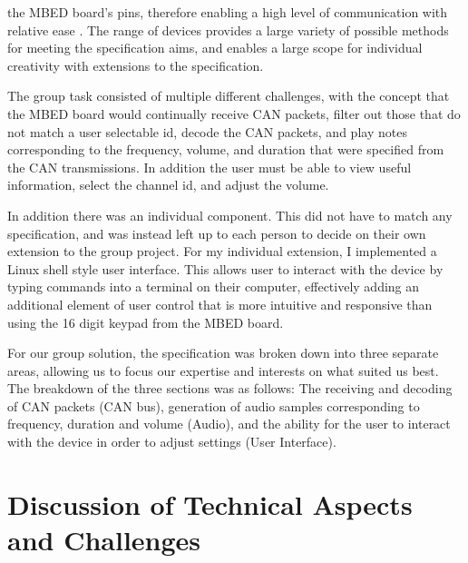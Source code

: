the MBED board's pins, therefore enabling a high level of communication with 
relative ease \cite{mbed-pins}. 
The range of devices provides a large variety of possible methods for meeting 
the specification aims, and enables a large scope for individual creativity with 
extensions to the specification.
\par\bigskip\noindent
The group task consisted of multiple different challenges, with the concept
that the MBED board would continually receive CAN packets, filter out those 
that do not match a user selectable id, decode the CAN packets, and play notes 
corresponding to the frequency, volume, and duration that were specified from 
the CAN transmissions. In addition the user must be able to view useful 
information, select the channel id, and adjust the volume. 
\par\bigskip\noindent
In addition there was an individual component. This did not have to match any 
specification, and was instead left up to each person to decide on their own 
extension to the group project. For my individual extension, I implemented a 
Linux shell style user interface. This allows user to interact with the device 
by typing commands into a terminal on their computer, effectively adding an 
additional element of user control that is more intuitive and responsive than 
using the 16 digit keypad from the MBED board.
\par\bigskip\noindent
For our group solution, the specification was broken down into three separate 
areas, allowing us to focus our expertise and interests on what suited us best.
The breakdown of the three sections was as follows: The receiving and 
decoding of CAN packets (CAN bus), generation of audio samples corresponding to 
frequency, duration and volume (Audio), and the ability for the user to 
interact with the device in order to adjust settings (User Interface). 

\section{Discussion of Technical Aspects and Challenges}

